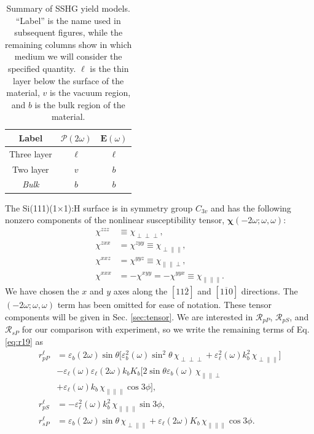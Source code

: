 \documentclass[prb,superscriptaddress,showpacs,twocolumn,letterpaper]{revtex4}
\begin{document}
\begin{table}[b]
\begin{ruledtabular}
\begin{tabular}{ c c c }
Label        &  $\boldsymbol{\mathcal{P}}(2\omega)$  &  $\mathbf{E}(\omega)$ \\
\hline
Three layer     &           $\ell$          &      $\ell$   \\
Two layer       &            $v$            &        $b$    \\
\emph{Bulk}     &            $b$            &        $b$    
\end{tabular}
\end{ruledtabular}
\caption{Summary of SSHG yield models. ``Label'' is the name used in subsequent
figures, while the remaining columns show in which medium we will consider the
specified quantity. $\ell$ is the thin layer below the surface of the material,
$v$ is the vacuum region, and $b$ is the bulk region of the
material.\label{tab:models}}
\end{table}


The Si(111)(1$\times$1):H surface is in symmetry group $C_{3v}$ and has the
following nonzero components\cite{sipePRB87} of the nonlinear susceptibility
tensor, $\boldsymbol{\chi}(-2\omega;\omega,\omega)$:
\begin{align*}
\chi^{zzz}&\equiv\chi_{\perp\perp\perp},\nonumber\\
\chi^{zxx}&=\chi^{zyy}\equiv\chi_{\perp\parallel\parallel},\nonumber\\
\chi^{xxz}&=\chi^{yyz}\equiv\chi_{\parallel\parallel\perp},\nonumber\\
\chi^{xxx}&=-\chi^{xyy}=-\chi^{yyx}\equiv\chi_{\parallel\parallel\parallel}.
\end{align*}
We have chosen the $x$ and $y$ axes along the $[11\overline{2}]$ and
$[1\overline{1}0]$ directions. The $(-2\omega;\omega,\omega)$ term has been
omitted for ease of notation. These tensor components will be given in Sec.
\ref{sec:tensor}. We are interested in $\mathcal{R}_{pP}$, $\mathcal{R}_{pS}$,
and $\mathcal{R}_{sP}$ for our comparison with experiment, so we write the
remaining terms of Eq. \eqref{eq:r19} as
\begin{align}
r^{\ell}_{pP} &= \varepsilon_{b}(2\omega)\sin\theta
\bigl[\varepsilon^{2}_{b}(\omega)\sin^{2}\theta\,\chi_{\perp\perp\perp} 
+ \varepsilon^{2}_{\ell}(\omega)k^{2}_{b}\,\chi_{\perp\parallel\parallel}\bigr]
\nonumber\\
&- \varepsilon_{\ell}(\omega)\varepsilon_{\ell}(2\omega)
k_{b}K_{b}\bigl[2\sin\theta\varepsilon_{b}(\omega)
\,\chi_{\parallel\parallel\perp}\nonumber\\
& + \varepsilon_{\ell}(\omega)k_{b}
\,\chi_{\parallel\parallel\parallel}\cos3\phi\bigr],\label{eq:rpP}\\
r^{\ell}_{pS} &= -\varepsilon_\ell^2(\omega)k^2_{b}
        \,\chi_{\parallel\parallel\parallel}\sin3\phi,\label{eq:rpS}\\
r^{\ell}_{sP} &= \varepsilon_{b}(2\omega)\sin\theta
        \,\chi_{\perp\parallel\parallel}
        + \varepsilon_{\ell}(2\omega)K_{b}
        \,\chi_{\parallel\parallel\parallel}\cos3\phi.\label{eq:rsP}
\end{align}
\end{document}
